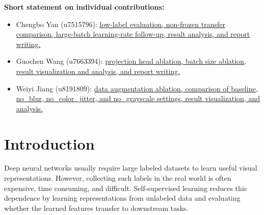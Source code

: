 \documentclass[10pt]{article}
\begin{document}
\vspace{0.8em}

\textbf{Short statement on individual contributions:}
\begin{itemize}[leftmargin=1.5em]
    \item Chengbo Yan (u7515796): \uline{low-label evaluation, non-frozen transfer comparison, large-batch learning-rate follow-up, result analysis, and report writing.}
    \item Guochen Wang (u7663394): \uline{projection head ablation, batch size ablation, result visualization and analysis, and report writing.}
    \item Weiyi Jiang (u8191809): \uline{data augmentation ablation, comparison of baseline, no\_blur, no\_color\_jitter, and no\_grayscale settings, result visualization, and analysis.}
\end{itemize}

\vspace{1em}

\begin{abstract}
This report presents a controlled ablation study of SimCLR on CIFAR-10 using a ResNet-18 encoder. We evaluate how data augmentation, projection head design, batch size, and label availability affect downstream representation quality, using frozen linear evaluation as the main metric. Removing ColorJitter causes the largest drop in linear evaluation accuracy, from 68.20\% to 62.61\%, while removing Gaussian blur has little effect. The projection head gives a modest improvement, increasing best accuracy from 62.16\% to 63.59\%. Batch size 256 performs best under the default setup, but batch size 1024 recovers from 57.56\% to 65.43\% after learning-rate tuning. Low-label experiments show that SimCLR mainly improves label efficiency. Overall, SimCLR performance in this lightweight setting depends on both representation design and optimization matching.
\end{abstract}

\newpage
\section{Introduction}

Deep neural networks usually require large labeled datasets to learn useful visual representations. However, collecting such labels in the real world is often expensive, time consuming, and difficult. Self-supervised learning reduces this dependence by learning representations from unlabeled data and evaluating whether the learned features transfer to downstream tasks.
\end{document}
